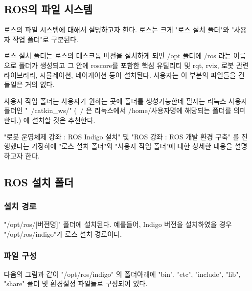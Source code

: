 \subsection{ROS의 파일 시스템}

로스의 파일 시스템에 대해서 설명하고자 한다. 로스는 크게 "로스 설치 폴더"와 "사용자 작업 폴더"로 구분된다. 

로스 설치 폴더는 로스의 데스크톱 버전을 설치하게 되면 /opt 폴더에 /ros 라는 이름으로 폴더가 생성되고 그 안에 roscore를 포함한 핵심 유틸리티 및 rqt, rviz, 로봇 관련 라이브러리, 시뮬레이션, 네이게이션 등이 설치된다. 사용자는 이 부분의 파일들을 건들일은 거의 없다. 

사용자 작업 폴더는 사용자가 원하는 곳에 폴더를 생성가능한데 필자는 리눅스 사용자 폴더인 "~/catkin\_ws/" (~/ 은 리눅스에서 /home/사용자명에 해당되는 폴더를 의미한다.) 에 설치할 것은 추천한다. 

"로봇 운영체제 강좌 : ROS Indigo 설치" 및 "ROS 강좌 : ROS 개발 환경 구축" 를 진행했다는 가정하에 "로스 설치 폴더"와 "사용자 작업 폴더"에 대한 상세한 내용을 설명하고자 한다.


\subsection{ROS 설치 폴더}

\subsubsection{설치 경로}

"/opt/ros/[버전명]" 폴더에 설치된다. 예를들어, Indigo 버전을 설치하였을 경우 "/opt/ros/indigo"가 로스 설치 경로이다.

\subsubsection{파일 구성}

다음의 그림과 같이 "/opt/ros/indigo" 의 폴더아래에 "bin", "etc", "include", "lib", "share" 폴더 및 환경설정 파일들로 구성되어 있다. 

